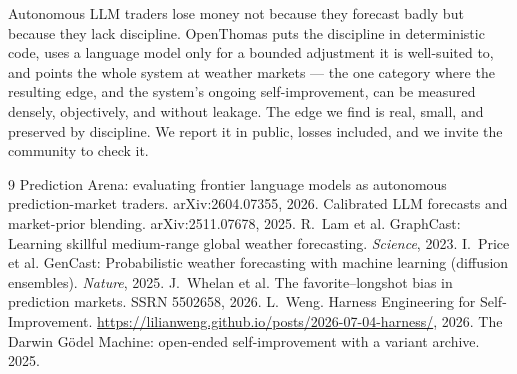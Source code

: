 \documentclass[10pt,twocolumn]{article}
\begin{document}
Autonomous LLM traders lose money not because they forecast badly but because
they lack discipline. OpenThomas puts the discipline in deterministic code, uses
a language model only for a bounded adjustment it is well-suited to, and points
the whole system at weather markets --- the one category where the resulting edge,
and the system's ongoing self-improvement, can be measured densely, objectively,
and without leakage. The edge we find is real, small, and preserved by discipline.
We report it in public, losses included, and we invite the community to check it.

\small
\begin{thebibliography}{9}
 Prediction Arena: evaluating frontier language models as
autonomous prediction-market traders. arXiv:2604.07355, 2026.
 Calibrated LLM forecasts and market-prior blending.
arXiv:2511.07678, 2025.
 R.~Lam et al. GraphCast: Learning skillful medium-range
global weather forecasting. \emph{Science}, 2023.
 I.~Price et al. GenCast: Probabilistic weather forecasting with
machine learning (diffusion ensembles). \emph{Nature}, 2025.
 J.~Whelan et al. The favorite--longshot bias in prediction
markets. SSRN 5502658, 2026.
 L.~Weng. Harness Engineering for Self-Improvement.
\url{https://lilianweng.github.io/posts/2026-07-04-harness/}, 2026.
 The Darwin G\"odel Machine: open-ended self-improvement with a
variant archive. 2025.
\end{thebibliography}
\end{document}
